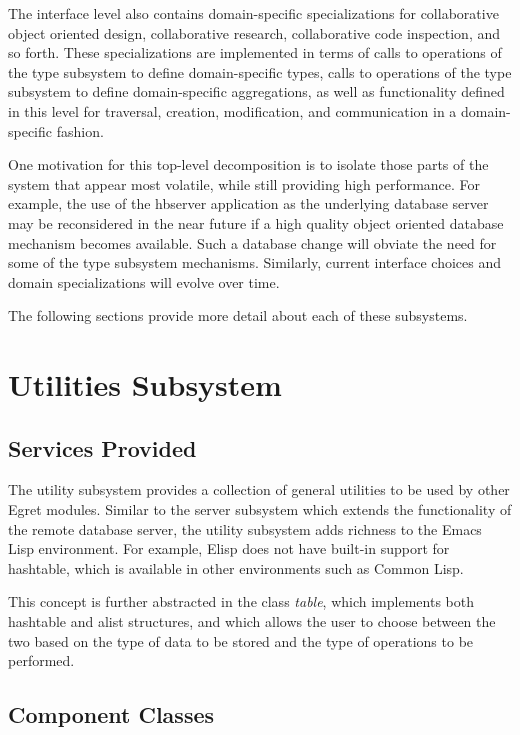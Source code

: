 \begin{itemizenoindent}
  The interface level also contains domain-specific specializations for
  collaborative object oriented design, collaborative research,
  collaborative code inspection, and so forth.  These specializations
  are implemented in terms of calls to operations of the type subsystem
  to define domain-specific types, calls to operations of the type
  subsystem to define domain-specific aggregations, as well as
  functionality defined in this level for traversal, creation,
  modification, and communication in a domain-specific fashion.

\end{itemizenoindent}

One motivation for this top-level decomposition is to isolate those
parts of the system that appear most volatile, while still providing
high performance.  For example, the use of the hbserver application as
the underlying database server may be reconsidered in the near future
if a high quality object oriented database mechanism becomes
available. Such a database change will obviate the need for some of
the type subsystem mechanisms.  Similarly, current interface choices
and domain specializations will evolve over time.

The following sections provide more detail about each of these subsystems. 

\section{Utilities Subsystem}

\subsection{Services Provided}

The utility subsystem provides a collection of general utilities to be used
by other Egret modules. Similar to the server subsystem which extends the
functionality of the remote database server, the utility subsystem adds
richness to the Emacs Lisp environment. For example, Elisp does not have
built-in support for hashtable, which is available in other environments
such as  Common Lisp.

This concept is further abstracted in the class {\it table\/}, which 
implements both hashtable and alist structures, and which allows the user to
choose between the two based on the type of data to be stored and the type of
operations to be performed.  


\subsection{Component Classes}

